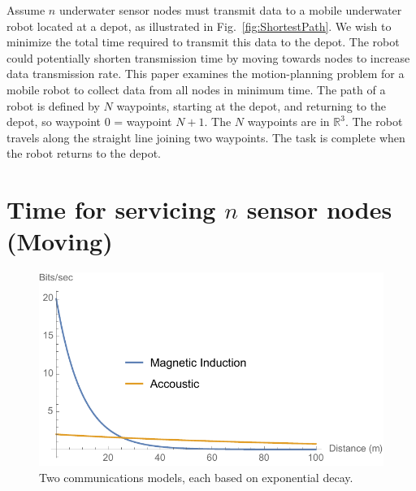 \documentclass{article}
\begin{document}
 Assume $n$ underwater sensor nodes must transmit data to a mobile underwater robot located at a depot, as illustrated in Fig.\ \ref{fig:ShortestPath}.  We wish to minimize the total time required to transmit this data to the depot. 
The robot could potentially shorten transmission time by moving towards nodes to increase data transmission rate.
This paper examines the motion-planning problem for a mobile robot to collect data from all nodes in minimum time.  
The path of a robot is defined by $N$ waypoints, starting at the depot, and returning to the depot, so waypoint 0 = waypoint $N+1$.
The $N$ waypoints are in $\mathbb{R}^3$. The robot travels along the straight line joining two waypoints. 
The task is complete when the robot returns to the depot.


\section{Time for servicing $n$ sensor nodes (Moving)}

\begin{figure}[htb]
\begin{center}
	\includegraphics[width=0.8\columnwidth]{CommModel}
\end{center}
\caption{Two communications models, each based on exponential decay. 
\label{fig:CommModel}}
\end{figure}
\end{document}
